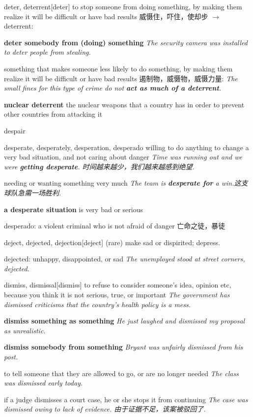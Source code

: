 \begin{DefWord}{deter, deterrent}[deter]
    to stop someone from doing something, by making them realize it will be difficult or have bad results 威慑住，吓住，使却步 $\rightarrow$  deterrent:

    \textbf{deter somebody from (doing) something}
    \textit{The security camera was installed to deter people from stealing.}

    something that makes someone less likely to do something, by making them realize it will be difficult or have bad results 遏制物，威慑物，威慑力量:
    \textit{The small fines for this type of crime do not \textbf{act as much of a deterrent}.}

    \textbf{nuclear deterrent} the nuclear weapons that a country has in order to prevent other countries from attacking it
\end{DefWord}

\begin{DefWord}{despair}
\end{DefWord}

\begin{DefWord}{desperate, desperately, desperation, desperado}
    willing to do anything to change a very bad situation, and not caring about danger
    \textit{Time was running out and we were \textbf{getting desperate}. 时间越来越少，我们越来越感到绝望. }

    needing or wanting something very much
    \textit{The team is \textbf{desperate for} a win.这支球队急需一场胜利. }

    \textbf{a desperate situation} is very bad or serious

    desperado:  a violent criminal who is not afraid of danger 亡命之徒，暴徒
\end{DefWord}

\begin{DefWord}{deject, dejected, dejection}[deject]
    (rare) make sad or dispirited; depress.

    dejected: unhappy, disappointed, or sad
    \textit{The unemployed stood at street corners, dejected.}
\end{DefWord}

\begin{DefWord}{dismiss, dismissal}[dismiss]
    to refuse to consider someone's idea, opinion etc, because you think it is not serious, true, or important
    \textit{The government has dismissed criticisms that the country's health policy is a mess.}

    \textbf{dismiss something as something}
    \textit{He just laughed and dismissed my proposal as unrealistic.}

    \textbf{dismiss somebody from something}
    \textit{ Bryant was unfairly dismissed from his post.}

    to tell someone that they are allowed to go, or are no longer needed
    \textit{The class was dismissed early today.}

    if a judge dismisses a court case, he or she stops it from continuing
    \textit{The case was dismissed owing to lack of evidence. 由于证据不足，该案被驳回了. }
\end{DefWord}

